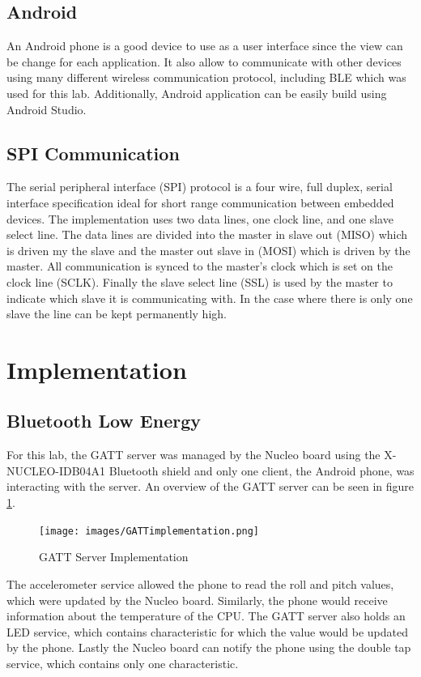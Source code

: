 \documentclass[12pt]{article}
\begin{document}
\subsection{Android}
An Android phone is a good device to use as a user interface since the view can be change for each application. It also allow to communicate with other devices using many different wireless communication protocol, including BLE which was used for this lab. Additionally, Android application can be easily build using Android Studio.

\subsection{SPI Communication}
The serial peripheral interface (SPI) protocol is a four wire, full duplex, serial interface specification ideal for short range communication between embedded devices. The implementation uses two data lines, one clock line, and one slave select line. The data lines are divided into the master in slave out (MISO) which is driven my the slave and the master out slave in (MOSI) which is driven by the master. All communication is synced to the master's clock which is set on the clock line (SCLK). Finally the slave select line (SSL) is used by the master to indicate which slave it is communicating with. In the case where there is only one slave the line can be kept permanently high.

\section{Implementation}
\subsection{Bluetooth Low Energy}
For this lab, the GATT server was managed by the Nucleo board using the X-NUCLEO-IDB04A1 Bluetooth shield and only one client, the Android phone, was interacting with the server. An overview of the GATT server can be seen in figure \ref{fig:gattimp}.

\begin{figure}[!htb]
 \centering
 \texttt{[image: images/GATTimplementation.png]}
 \caption{GATT Server Implementation}
 \label{fig:gattimp}
\end{figure}

The accelerometer service allowed the phone to read the roll and pitch values, which were updated by the Nucleo board. Similarly, the phone would receive information about the temperature of the CPU. The GATT server also holds an LED service, which contains characteristic for which the value would be updated by the phone. Lastly the Nucleo board can notify the phone using the double tap service, which contains only one characteristic.
\end{document}
